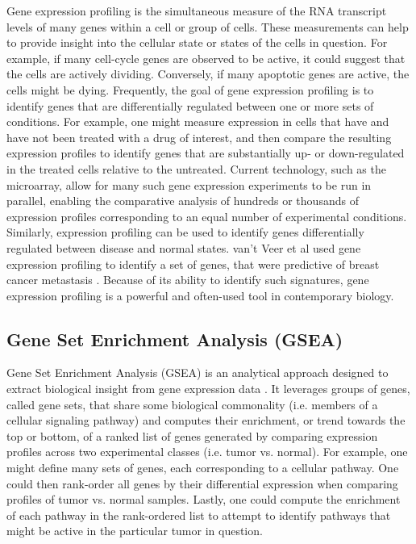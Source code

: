 \documentclass[12pt]{article}
\begin{document}
Gene expression profiling is the simultaneous measure of the RNA transcript levels of many genes within a cell or group of cells. These measurements can help to provide insight into the cellular state or states of the cells in question. For example, if many cell-cycle genes are observed to be active, it could suggest that the cells are actively dividing. Conversely, if many apoptotic genes are active, the cells might be dying. Frequently, the goal of gene expression profiling is to identify genes that are differentially regulated between one or more sets of conditions. For example, one might measure expression in cells that have and have not been treated with a drug of interest, and then compare the resulting expression profiles to identify genes that are substantially up- or down-regulated in the treated cells relative to the untreated. Current technology, such as the microarray, allow for many such gene expression experiments to be run in parallel, enabling the comparative analysis of hundreds or thousands of expression profiles corresponding to an equal number of experimental conditions. Similarly, expression profiling can be used to identify genes differentially regulated between disease and normal states. van't Veer et al used gene expression profiling to identify a set of genes, that were predictive of breast cancer metastasis \cite{van_t_veer_gene_2002}. Because of its ability to identify such signatures, gene expression profiling is a powerful and often-used tool in contemporary biology.

\subsection{Gene Set Enrichment Analysis (GSEA)}

Gene Set Enrichment Analysis (GSEA) is an analytical approach designed to extract biological insight from gene expression data \cite{subramanian_gene_2005}. It leverages  groups of genes, called gene sets, that share some biological commonality (i.e. members of a cellular signaling pathway) and computes their enrichment, or trend towards the top or bottom, of a ranked list of genes generated by comparing expression profiles across two experimental classes (i.e. tumor vs. normal). For example, one might define many sets of genes, each corresponding to a cellular pathway. One could then rank-order all genes by their differential expression when comparing profiles of tumor vs. normal samples. Lastly, one could compute the enrichment of each pathway in the rank-ordered list to attempt to identify pathways that might be active in the particular tumor in question.
\end{document}
